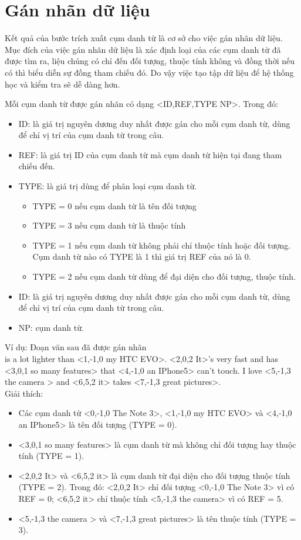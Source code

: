 \documentclass[12pt]{report}
\begin{document}
		\section{Gán nhãn dữ liệu}
			\par Kết quả của bước trích xuất cụm danh từ là cơ sở cho việc gán nhãn dữ liệu. Mục đích của việc gán nhãn dữ liệu là xác định loại của các cụm danh từ đã được tìm ra, liệu chúng có chỉ đến đối tượng, thuộc tính không và đồng thời nếu có thì biểu diễn sự đồng tham chiếu đó. Do vậy việc tạo tập dữ liệu để hệ thống học và kiểm tra sẽ dễ dàng hơn.
			\par Mỗi cụm danh từ được gán nhãn có dạng <ID,REF,TYPE NP>. Trong đó:
				\begin{itemize}
					\item{ID: là giá trị nguyên dương duy nhất được gán cho mỗi cụm danh từ, dùng để chỉ vị trí của cụm danh từ trong câu.}
					\item{REF: là giá trị ID của cụm danh từ mà cụm danh từ hiện tại đang  tham chiếu đến.}
					\item{TYPE: là giá trị dùng để phân loại cụm danh từ. 
						\begin{itemize}
							\item{TYPE = 0 nếu cụm danh từ là tên đối tượng}
							\item{TYPE = 3 nếu cụm danh từ là thuộc tính}
							\item{TYPE = 1 nếu cụm danh từ không phải chỉ thuộc tính hoặc đối tượng. Cụm danh từ nào có TYPE là 1 thì giá trị REF của nó là 0.}
							\item{TYPE = 2 nếu cụm danh từ dùng để đại diện cho đối tượng, thuộc tính.}
						\end{itemize}}
					\item{ID: là giá trị nguyên dương duy nhất được gán cho mỗi cụm danh từ, dùng để chỉ vị trí của cụm danh từ trong câu.}
					\item{NP: cụm danh từ.}
				\end{itemize}
			\par Ví dụ: Đoạn văn sau đã được gán nhãn
				\\<0,-1,0 The Note 3> is a lot lighter than <1,-1,0 my HTC EVO>. <2,0,2 It>'s very fast and has <3,0,1 so many features> that <4,-1,0 an IPhone5> can't touch. I love <5,-1,3 the camera > and <6,5,2 it> takes <7,-1,3 great pictures>.
				\\Giải thích: 
				\begin{itemize}
					\item{Các cụm danh từ <0,-1,0 The Note 3>, <1,-1,0 my HTC EVO> và <4,-1,0 an IPhone5> là tên đối tượng (TYPE = 0).}
					\item{<3,0,1 so many features> là cụm danh từ mà không chỉ đối tượng hay thuộc tính (TYPE = 1).}
					\item{<2,0,2 It> và <6,5,2 it> là cụm danh từ đại diện cho đối tượng thuộc tính (TYPE = 2). Trong đó: <2,0,2 It> chỉ đối tượng <0,-1,0 The Note 3> vì có REF = 0; <6,5,2 it> chỉ thuộc tính <5,-1,3 the camera> vì có REF = 5.}
					\item{<5,-1,3 the camera > và <7,-1,3 great pictures> là tên thuộc tính (TYPE = 3).}
				\end{itemize} 
\end{document}
